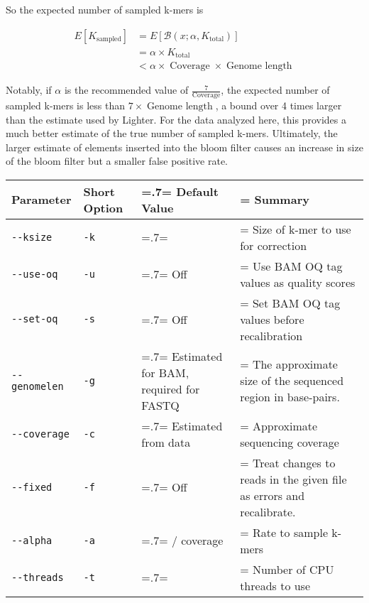 So the expected number of sampled k-mers is

\begin{align}
E[K_{\operatorname{sampled}}] &= E[\mathcal{B}(x; \alpha, K_{\operatorname{total}})] \\
&= \alpha \times K_{\operatorname{total}} \\
&< \alpha \times \operatorname{Coverage} \times \operatorname{Genome\:length}
\end{align}

Notably, if $\alpha$ is the recommended value of $\frac{7}{\operatorname{Coverage}}$, the expected number of sampled k-mers is less than $7 \times \operatorname{Genome\:length}$, a bound over 4 times larger than the estimate used by Lighter. For the data analyzed here, this provides a much better estimate of the true number of sampled k-mers. Ultimately, the larger estimate of elements inserted into the bloom filter causes an increase in size of the bloom filter but a smaller false positive rate.

\begin{table}
\centering
\begin{tabularx}{\textwidth}{ l  l >{\hsize=.7\hsize\linewidth=\hsize}X >{\hsize=1.3\hsize\linewidth=\hsize}X }
\toprule
\textbf{Parameter} & \textbf{Short Option} & \textbf{Default Value} & \textbf{Summary} \\
\midrule
\texttt{-\phantom{}-ksize} & \texttt{-k} & 32 & Size of k-mer to use for correction\\
\texttt{-\phantom{}-use-oq} & \texttt{-u} & Off & Use BAM OQ tag values as quality scores\\
\texttt{-\phantom{}-set-oq} & \texttt{-s} & Off & Set BAM OQ tag values before recalibration\\
\texttt{-\phantom{}-genomelen} & \texttt{-g} & Estimated for BAM, required for FASTQ & The approximate size of the sequenced region in base-pairs.\\
\texttt{-\phantom{}-coverage} & \texttt{-c} & Estimated from data & Approximate sequencing coverage\\
\texttt{-\phantom{}-fixed} & \texttt{-f} & Off & Treat changes to reads in the given file as errors and recalibrate. \\
\texttt{-\phantom{}-alpha} & \texttt{-a} & 7 / coverage & Rate to sample k-mers\\
\texttt{-\phantom{}-threads} & \texttt{-t} & 1 & Number of CPU threads to use\\
\bottomrule
\end{tabularx}
\label{table:params}
\end{table}

